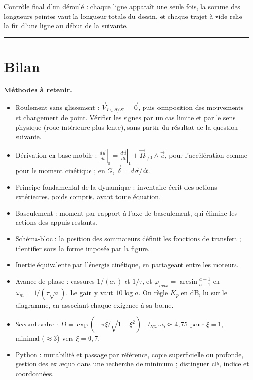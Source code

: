 \documentclass[11pt,a4paper]{article}
\providecommand{\tightlist}{\setlength{\itemsep}{0pt}\setlength{\parskip}{0pt}}
\begin{document}
\begin{methode}

Contrôle final d'un déroulé : chaque ligne apparaît une seule fois, la somme des longueurs peintes vaut la longueur totale du dessin, et chaque trajet à vide relie la fin d'une ligne au début de la suivante.

\end{methode}

\begin{center}\rule{0.5\linewidth}{0.5pt}\end{center}

\hypertarget{bilan}{%
\section{Bilan}\label{bilan}}

\textbf{Méthodes à retenir.}

\begin{itemize}
\tightlist
\item
  Roulement sans glissement : \(\vec V_{I\in S/S'} = \vec 0\), puis composition des mouvements et changement de point. Vérifier les signes par un cas limite et par le sens physique (roue intérieure plus lente), sans partir du résultat de la question suivante.
\item
  Dérivation en base mobile : \(\left.\frac{d\vec u}{dt}\right|_0 = \left.\frac{d\vec u}{dt}\right|_1 + \vec\Omega_{1/0}\wedge\vec u\), pour l'accélération comme pour le moment cinétique ; en \(G\), \(\vec\delta = d\vec\sigma/dt\).
\item
  Principe fondamental de la dynamique : inventaire écrit des actions extérieures, poids compris, avant toute équation.
\item
  Basculement : moment par rapport à l'axe de basculement, qui élimine les actions des appuis restants.
\item
  Schéma-bloc : la position des sommateurs définit les fonctions de transfert ; identifier sous la forme imposée par la figure.
\item
  Inertie équivalente par l'énergie cinétique, en partageant entre les moteurs.
\item
  Avance de phase : cassures \(1/(a\tau)\) et \(1/\tau\), et \(\varphi_{max} = \arcsin\frac{a-1}{a+1}\) en \(\omega_m = 1/(\tau\sqrt a)\). Le gain y vaut \(10\log a\). On règle \(K_p\) en dB, lu sur le diagramme, en associant chaque exigence à sa borne.
\item
  Second ordre : \(D = \exp(-\pi\xi/\sqrt{1 - \xi^2})\) ; \(t_{5\%}\,\omega_0 \approx 4{,}75\) pour \(\xi = 1\), minimal (\(\approx 3\)) vers \(\xi = 0{,}7\).
\item
  Python : mutabilité et passage par référence, copie superficielle ou profonde, gestion des ex æquo dans une recherche de minimum ; distinguer clé, indice et coordonnées.
\end{itemize}
\end{document}
